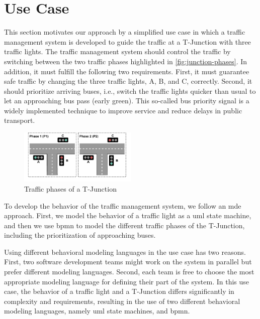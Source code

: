 \documentclass{jot}
\begin{document}
\section{Use Case} \label{sec:usecase}
This section motivates our approach by a simplified use case in which a traffic management system is developed to guide the traffic at a T-Junction with three traffic lights.
The traffic management system should control the traffic by switching between the two traffic phases highlighted in \autoref{fig:junction-phases}.
In addition, it must fulfill the following two requirements.
First, it must guarantee safe traffic by changing the three traffic lights, A, B, and C, correctly.
Second, it should prioritize arriving buses, i.e., switch the traffic lights quicker than usual to let an approaching bus pass (early green).
This so-called bus priority signal is a widely implemented technique to improve service and reduce delays in public transport.

\begin{figure}[h]
    \centering
    \includegraphics[width=0.5\textwidth]{figures/phases.pdf}
    \caption{Traffic phases of a T-Junction}
    \label{fig:junction-phases}
\end{figure}

To develop the behavior of the traffic management system, we follow an \gls*{mde} approach.
First, we model the behavior of a traffic light as a \gls*{uml} state machine, and then we use \gls*{bpmn} to model the different traffic phases of the T-Junction, including the prioritization of approaching buses.

Using different behavioral modeling languages in the use case has two reasons.
First, two software development teams might work on the system in parallel but prefer different modeling languages.
Second, each team is free to choose the most appropriate modeling language for defining their part of the system.
In this use case, the behavior of a traffic light and a T-Junction differs significantly in complexity and requirements, resulting in the use of two different behavioral modeling languages, namely \gls*{uml} state machines, and \gls*{bpmn}.
\end{document}
